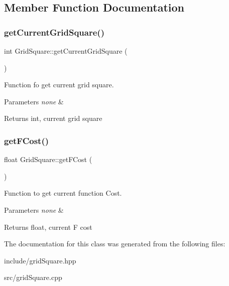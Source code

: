 \subsection{Member Function Documentation}
\mbox{\label{class_grid_square_acea2649a57dd575402c2366de18cd9a8}} 
\subsubsection{\texorpdfstring{get\+Current\+Grid\+Square()}{getCurrentGridSquare()}}
{\footnotesize\ttfamily int Grid\+Square\+::get\+Current\+Grid\+Square (\begin{DoxyParamCaption}{ }\end{DoxyParamCaption})}



Function fo get current grid square. 


\begin{DoxyParams}{Parameters}
{\em none} & \\
\hline
\end{DoxyParams}
\begin{DoxyReturn}{Returns}
int, current grid square 
\end{DoxyReturn}
\mbox{\label{class_grid_square_a6e82cc70c531d6a2fede8dadb3cd1e02}} 
\subsubsection{\texorpdfstring{get\+F\+Cost()}{getFCost()}}
{\footnotesize\ttfamily float Grid\+Square\+::get\+F\+Cost (\begin{DoxyParamCaption}{ }\end{DoxyParamCaption})}



Function to get current function Cost. 


\begin{DoxyParams}{Parameters}
{\em none} & \\
\hline
\end{DoxyParams}
\begin{DoxyReturn}{Returns}
float, current F cost 
\end{DoxyReturn}


The documentation for this class was generated from the following files\+:\begin{DoxyCompactItemize}
\item 
include/grid\+Square.\+hpp\item 
src/grid\+Square.\+cpp\end{DoxyCompactItemize}
